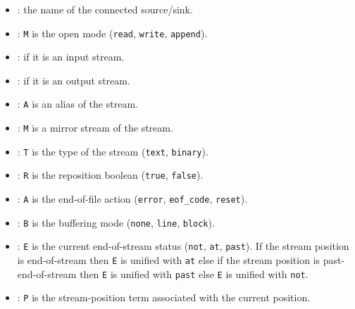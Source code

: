 \begin{itemize}

\item {}: the name of the connected 
source/sink.

\item {}: \texttt{M} is the open mode (\texttt{read},
\texttt{write}, \texttt{append}).

\item {}: if it is an input stream.

\item {}: if it is an output stream.

\item {}: \texttt{A} is an alias of the stream.

\item {}: \texttt{M} is a mirror stream of the 
stream.

\item {}: \texttt{T} is the type of the stream
(\texttt{text}, \texttt{binary}).

\item {}: \texttt{R} is the reposition
boolean (\texttt{true}, \texttt{false}).

\item {}: \texttt{A} is the end-of-file
action (\texttt{error}, \texttt{eof\_code}, \texttt{reset}).

\item {}: \texttt{B} is the buffering mode
(\texttt{none}, \texttt{line}, \texttt{block}).

\item {}: \texttt{E} is the
current end-of-stream status (\texttt{not}, \texttt{at}, \texttt{past}). If
the stream position is end-of-stream then \texttt{E} is unified with
\texttt{at} else if the stream position is past-end-of-stream then \texttt{E}
is unified with \texttt{past} else \texttt{E} is unified with \texttt{not}.

\item {}: \texttt{P} is the stream-position
term associated with the current position.

\end{itemize}

